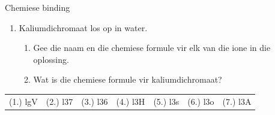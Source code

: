 \begin{eocexercises}{Chemiese binding}
\begin{enumerate}[noitemsep, label=\textbf{\arabic*}. ]
              \label{m38689*uid185}\item Kaliumdichromaat los op in water.
\label{m38689*id148361}\begin{enumerate}[noitemsep, label=\textbf{\alph*}. ] 
            \label{m38689*uid186}\item Gee die naam en die chemiese formule vir elk van die ione in die oplossing.
\label{m38689*uid187}\item Wat is die chemiese formule vir kaliumdichromaat?
\end{enumerate}
                \end{enumerate}

\practiceinfo
\begin{tabular}[h]{cccccc}
 (1.) lgV  &  (2.) l37  &  (3.) l36  &  (4.) l3H  &  (5.) l3s  &  (6.) l3o  &  (7.) l3A  &
\end{tabular}
\end{eocexercises}
